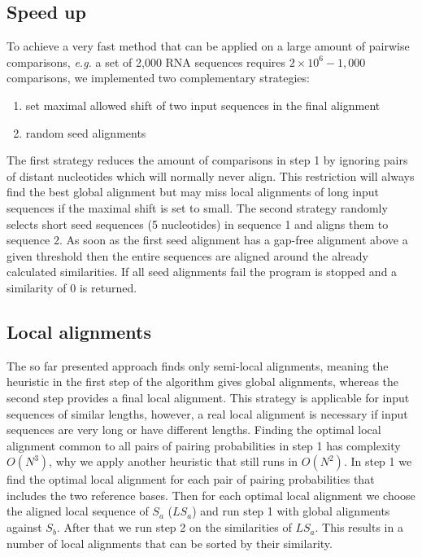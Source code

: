 \documentclass[a4paper,twoside]{article}
\newcommand\eg{\textit{e.g.}}
\begin{document}
\subsection{Speed up}

To achieve a very fast method that can be applied on a large amount of pairwise
comparisons, \eg{} a set of 2,000 RNA sequences requires $2 \times 10^6 - 1,000$
comparisons, we implemented two complementary strategies:
\begin{enumerate}
\item set maximal allowed shift of two input sequences in the final alignment
\item random seed alignments
\end{enumerate}
The first strategy reduces the amount of comparisons in step 1 by ignoring pairs
of distant nucleotides which will normally never align. This restriction will
always find the best global alignment but may miss local alignments of long
input sequences if the maximal shift is set to small. The second strategy
randomly selects short seed sequences (5 nucleotides) in sequence 1 and aligns
them to sequence 2. As soon as the first seed alignment has a gap-free alignment
above a given threshold then the entire sequences are aligned around the already
calculated similarities. If all seed alignments fail the program is stopped and
a similarity of 0 is returned.


\subsection{Local alignments}

The so far presented approach finds only semi-local alignments, meaning the
heuristic in the first step of the algorithm gives global alignments, whereas
the second step provides a final local alignment. This strategy is applicable
for input sequences of similar lengths, however, a real local alignment is
necessary if input sequences are very long or have different lengths. Finding
the optimal local alignment common to all pairs of pairing probabilities in
step 1 has complexity $O(N^3)$, why we apply another heuristic that still runs
in $O(N^2)$. In step 1 we find the optimal local alignment for each pair of
pairing probabilities that includes the two reference bases. Then for each
optimal local alignment we choose the aligned local sequence of $S_a$ ($LS_a$)
and run step 1 with global alignments against $S_b$. After that we run step 2
on the similarities of $LS_a$.  This results in a number of local alignments
that can be sorted by their similarity.
\end{document}
